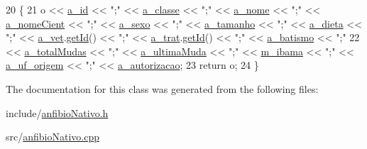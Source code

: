 \begin{DoxyCode}
20 \{
21     o << \hyperlink{classAnimal_a1eab12d1133a739dc0fea720cf6cc927}{a\_id} << \textcolor{stringliteral}{";"} << \hyperlink{classAnimal_a1f32b4455559489b5f5dce71913a6f8f}{a\_classe} << \textcolor{stringliteral}{";"} << \hyperlink{classAnimal_ad815bbe345d7c5274858ac8ccb24bc52}{a\_nome} << \textcolor{stringliteral}{";"} << 
      \hyperlink{classAnimal_af2ae0fc23b0eaf3edaee4579f6199dfc}{a\_nomeCient} << \textcolor{stringliteral}{";"} << \hyperlink{classAnimal_af2b1c520d145f82af7a5a88bb4271a0d}{a\_sexo} << \textcolor{stringliteral}{";"} << \hyperlink{classAnimal_a72366b060dfdbc0dd074fbe41decfcc2}{a\_tamanho} << \textcolor{stringliteral}{";"} << 
      \hyperlink{classAnimal_a32088524517a531af269e3ec04275135}{a\_dieta} << \textcolor{stringliteral}{";"} << \hyperlink{classAnimal_a12ce5681957e27dae674cbbde7fb1e4f}{a\_vet}.\hyperlink{classFuncionario_a0288286a907e587b7ab75d6c23354a06}{getId}() << \textcolor{stringliteral}{";"} << \hyperlink{classAnimal_a19fbf607b29b06a86f598dd1ffb8c712}{a\_trat}.\hyperlink{classFuncionario_a0288286a907e587b7ab75d6c23354a06}{getId}() << \textcolor{stringliteral}{";"} << 
      \hyperlink{classAnimal_a4e308163c5b3d82e546fb39b399bcb71}{a\_batismo} << \textcolor{stringliteral}{";"}
22     << \hyperlink{classAnfibio_a322af56e1ff61753e6abfe2693d29504}{a\_totalMudas} << \textcolor{stringliteral}{";"} << \hyperlink{classAnfibio_a674f19d430b4781216fac1fee2567771}{a\_ultimaMuda} << \textcolor{stringliteral}{";"} << 
      \hyperlink{classAnimalSilvestre_a4c92c625318b23e550b8bb24fb934d14}{m\_ibama} << \textcolor{stringliteral}{";"} << \hyperlink{classNativo_a260f26d7ad44221c1dca0ec01183482a}{a\_uf\_origem} << \textcolor{stringliteral}{";"} << \hyperlink{classNativo_a1dc025166815eb0f250ce58330e4fbcb}{a\_autorizacao};
23     \textcolor{keywordflow}{return} o;
24 \}
\end{DoxyCode}


The documentation for this class was generated from the following files\+:\begin{DoxyCompactItemize}
\item 
include/\hyperlink{anfibioNativo_8h}{anfibio\+Nativo.\+h}\item 
src/\hyperlink{anfibioNativo_8cpp}{anfibio\+Nativo.\+cpp}\end{DoxyCompactItemize}
